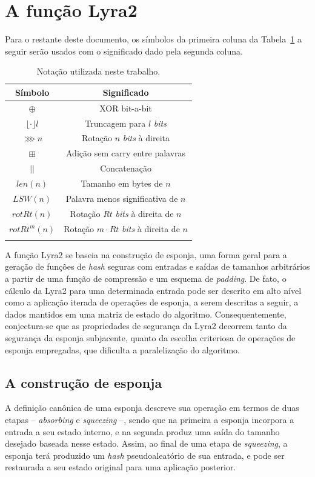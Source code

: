 \documentclass{article}
\begin{document}
\section{A função Lyra2}

Para o restante deste documento, os símbolos da primeira coluna da
Tabela~\ref{tb:notation} a seguir serão usados com o significado dado pela segunda coluna.

\begin{longtable}[c]{@{}cc@{}}
\toprule
Símbolo & Significado\tabularnewline
\midrule
\endhead
$\oplus$ & XOR bit-a-bit\tabularnewline
$\lfloor \cdot \rfloor l$ & Truncagem para $l$ \emph{bits}\tabularnewline
$\ggg n$ & Rotação $n$ \emph{bits} à direita\tabularnewline
$\boxplus$ & Adição sem carry entre palavras\tabularnewline
$||$ & Concatenação\tabularnewline
$len(n)$ & Tamanho em bytes de $n$\tabularnewline
$LSW(n)$ & Palavra menos significativa de $n$\tabularnewline
$rotRt(n)$ & Rotação $Rt$ \emph{bits} à direita de $n$\tabularnewline
$rotRt^{m}(n)$ & Rotação $m \cdot Rt$ \emph{bits} à direita de
$n$\tabularnewline
\bottomrule
\caption{\label{tb:notation} Notação utilizada neste trabalho.}
\end{longtable}

\vspace{-1cm}
A função Lyra2 se baseia na construção de esponja, uma forma geral para a
geração de funções de \emph{hash} seguras com entradas e saídas de
tamanhos arbitrários a partir de uma função de compressão e um esquema
de \emph{padding}. De fato, o cálculo da Lyra2 para uma determinada entrada pode ser
descrito em alto nível como a aplicação iterada de operações de esponja,
a serem descritas a seguir, a dados mantidos em uma matriz de estado do
algoritmo. Consequentemente, conjectura-se que as propriedades de
segurança da Lyra2 decorrem tanto da segurança da esponja subjacente,
quanto da escolha criteriosa de operações de esponja empregadas, que
dificulta a paralelização do algoritmo.

\subsection{A construção de esponja}

A definição canônica de uma esponja \cite{sponge} descreve sua operação
em termos de duas etapas -- \emph{absorbing} e \emph{squeezing} --,
sendo que na primeira a esponja incorpora a entrada a seu estado
interno, e na segunda produz uma saída do tamanho desejado baseada nesse
estado. Assim, ao final de uma etapa de \emph{squeezing}, a esponja terá
produzido um \emph{hash} pseudoaleatório de sua entrada, e pode ser
restaurada a seu estado original para uma aplicação posterior.
\end{document}
